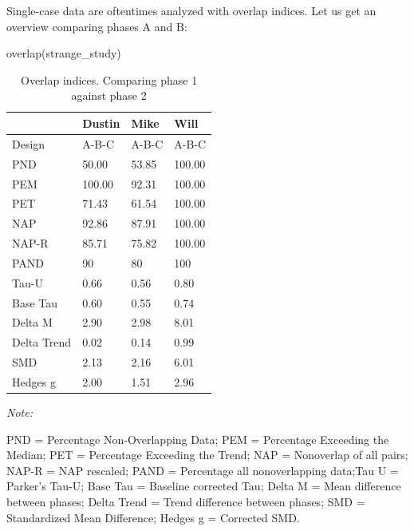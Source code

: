 \documentclass[
]{book}
\newenvironment{Shaded}{\begin{snugshade}}{\end{snugshade}}
\newcommand{\FunctionTok}[1]{\textcolor[rgb]{0.00,0.00,0.00}{#1}}
\newcommand{\NormalTok}[1]{#1}
\begin{document}
Single-case data are oftentimes analyzed with overlap indices. Let us get an overview comparing phases A and B:

\begin{Shaded}
\begin{Highlighting}[]
\FunctionTok{overlap}\NormalTok{(strange\_study)}
\end{Highlighting}
\end{Shaded}

\begin{table}[!h]

\caption{\label{tab:overlapAB-strange-study}Overlap indices. Comparing phase 1 against phase 2}
\begin{threeparttable}
\begin{tabular}[t]{llll}
\toprule
  & Dustin & Mike & Will\\
\midrule
Design & A-B-C & A-B-C & A-B-C\\
PND & 50.00 & 53.85 & 100.00\\
PEM & 100.00 & 92.31 & 100.00\\
PET & 71.43 & 61.54 & 100.00\\
NAP & 92.86 & 87.91 & 100.00\\
NAP-R & 85.71 & 75.82 & 100.00\\
PAND & 90 & 80 & 100\\
Tau-U & 0.66 & 0.56 & 0.80\\
Base Tau & 0.60 & 0.55 & 0.74\\
Delta M & 2.90 & 2.98 & 8.01\\
Delta Trend & 0.02 & 0.14 & 0.99\\
SMD & 2.13 & 2.16 & 6.01\\
Hedges g & 2.00 & 1.51 & 2.96\\
\bottomrule
\end{tabular}
\begin{tablenotes}
\item \textit{Note: } 
\item PND = Percentage Non-Overlapping Data; PEM = Percentage Exceeding the Median; PET = Percentage Exceeding the Trend; NAP = Nonoverlap of all pairs; NAP-R = NAP rescaled; PAND = Percentage all nonoverlapping data;Tau U = Parker's Tau-U; Base Tau = Baseline corrected Tau; Delta M = Mean difference between phases; Delta Trend = Trend difference between phases; SMD = Standardized Mean Difference; Hedges g = Corrected SMD.
\end{tablenotes}
\end{threeparttable}
\end{table}
\end{document}
